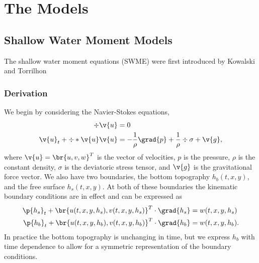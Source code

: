 \chapter{The Models}


\section{Shallow Water Moment Models}

The shallow water moment equations (SWME) were first introduced by
Kowalski and Torrilhon\cite{}

\subsection{Derivation}
  We begin by considering the Navier-Stokes equations,
  \begin{align}
    \div{\v{u}} &= 0 \\
    \v{u}_t + \div*{\v{u}\v{u}} &= - \frac{1}{\rho} \grad{p}
    + \frac{1}{\rho} \div{\sigma} + \v{g},
  \end{align}
  where \(\v{u} = \br{u, v, w}^T\) is the vector of velocities, \(p\) is the pressure,
  \(\rho \) is the constant density, \(\sigma \) is the deviatoric stress tensor, and
  \(\v{g}\) is the gravitational force vector.
  We also have two boundaries, the bottom topography \(h_b(t, x, y)\), and the free
  surface \(h_s(t, x, y)\).
  At both of these boundaries the kinematic boundary conditions are in effect and can
  be expressed as
  \begin{align}
    \p{h_s}_t + \br{u(t, x, y, h_s), v(t, x, y, h_s)}^T \cdot \grad{h_s}
    &= w(t, x, y, h_s) \\
    \p{h_b}_t + \br{u(t, x, y, h_b), v(t, x, y, h_b)}^T \cdot \grad{h_b}
    &= w(t, x, y, h_b).
  \end{align}
  In practice the bottom topography is unchanging in time, but we express \(h_b\) with
  time dependence to allow for a symmetric representation of the boundary conditions.

